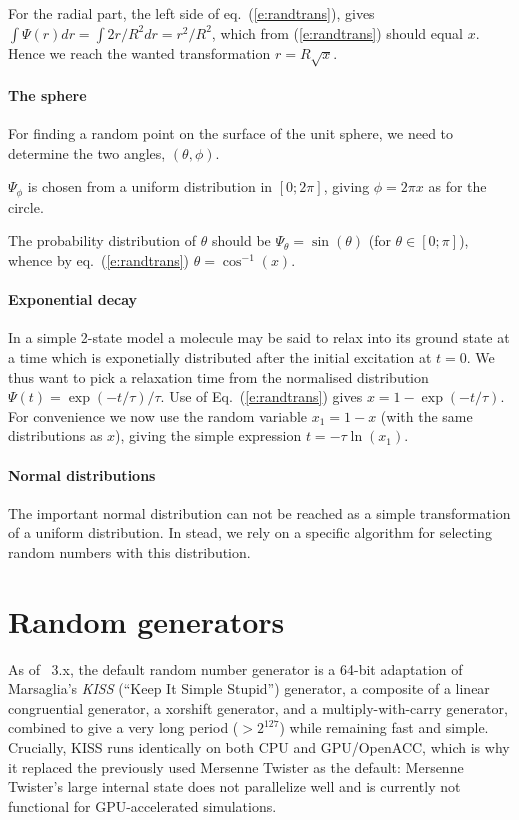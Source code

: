 For the radial part, the left side of eq.~(\ref{e:randtrans}), gives
$\int \Psi(r) dr = \int 2 r/R^2 dr = r^2/R^2$,
which from (\ref{e:randtrans}) should equal $x$.
Hence we reach the wanted transformation $r = R\sqrt{x}$.

\paragraph{The sphere}
For finding a random point on the surface of the unit sphere,
we need to determine the two angles, $(\theta, \phi)$.

$\Psi_\phi$ is chosen from a uniform distribution
in $[0; 2\pi]$, giving $\phi = 2\pi x$ as for the circle.

The probability distribution of $\theta$ should be
$\Psi_\theta=\sin(\theta)$ (for $\theta \in [0; \pi ]$),
whence by eq.~(\ref{e:randtrans}) $\theta=\cos^{-1}(x)$.

\paragraph{Exponential decay}

In a simple 2-state model a molecule may be said to relax into its ground state
at a time which is exponetially distributed after the initial excitation at $t=0$. 
We thus want to pick a relaxation time from the normalised distribution
$\Psi(t) = \exp(-t/\tau) / \tau$.
Use of Eq.~(\ref{e:randtrans}) gives
$x = 1 - \exp(-t/\tau)$. For convenience we now use the random variable
$x_1 = 1-x$ (with the same distributions as $x$),
giving the simple expression $t = - \tau \ln (x_1)$.

\paragraph{Normal distributions}
The important normal distribution can not be reached as a simple
transformation of a uniform distribution.
In stead, we rely on a specific algorithm for selecting random
numbers with this distribution.

\section{Random generators}
As of \MCX\ 3.x, the default random number generator is a 64-bit
adaptation of Marsaglia's \emph{KISS} (``Keep It Simple Stupid'')
generator, a composite of a linear congruential generator, a xorshift
generator, and a multiply-with-carry generator, combined to give a very
long period ($>2^{127}$) while remaining fast and simple. Crucially,
KISS runs identically on both CPU and GPU/OpenACC, which is why it
replaced the previously used Mersenne Twister as the default: Mersenne
Twister's large internal state does not parallelize well and is
currently not functional for GPU-accelerated simulations.

